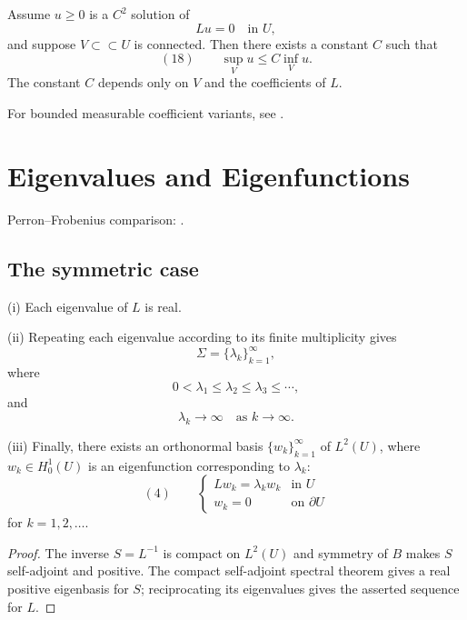 \begin{theorem}
\label{thm:harnacks-inequality-elliptic}
Assume $u \geq 0$ is a $C^2$ solution of
$$Lu = 0 \quad \text{in } U,$$
and suppose $V \subset\subset U$ is connected. Then there exists a constant $C$ such that
$$(18) \qquad \sup_V u \leq C\inf_V u.$$
The constant $C$ depends only on $V$ and the coefficients of $L$.
\end{theorem}
For bounded measurable coefficient variants, see \cite{GilbargTrudinger1983}.

\section{Eigenvalues and Eigenfunctions}
\label{sec:elliptic-eigenvalues}
Perron--Frobenius comparison: \cite{Gantmacher1977}.

\subsection{The symmetric case}

\begin{theorem}
\label{thm:existence-eigenvalues-symmetric-operator}
(i) Each eigenvalue of $L$ is real.

(ii) Repeating each eigenvalue according to its finite multiplicity gives
$$\Sigma = \{\lambda_k\}_{k=1}^\infty,$$
where
$$0 < \lambda_1 \leq \lambda_2 \leq \lambda_3 \leq \cdots,$$
and
$$\lambda_k \to \infty \quad \text{as } k \to \infty.$$

(iii) Finally, there exists an orthonormal basis $\{w_k\}_{k=1}^\infty$ of $L^2(U)$, where $w_k \in H_0^1(U)$ is an eigenfunction corresponding to $\lambda_k$:
$$(4) \qquad \begin{cases} Lw_k = \lambda_k w_k & \text{in } U \\ w_k = 0 & \text{on } \partial U \end{cases}$$
for $k = 1,2,\ldots$.
\end{theorem}

\begin{proof}
\sketch The inverse $S=L^{-1}$ is compact on $L^2(U)$ and symmetry of $B$ makes $S$ self-adjoint and positive. The compact self-adjoint spectral theorem gives a real positive eigenbasis for $S$; reciprocating its eigenvalues gives the asserted sequence for $L$.
\end{proof}

